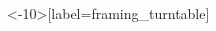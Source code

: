 \documentclass[presentation]{subfiles}
\begin{document}
\begin{frame}<-10>[label=framing_turntable]

    \vspace{1.5em}
    \begin{columns}
    \begin{column}{0.5\textwidth}

    \vspace{1em}

    
    

\end{column}
\end{columns}
\end{frame}
\end{document}
